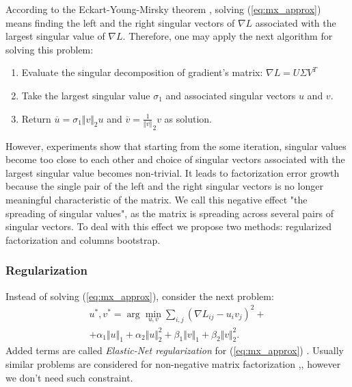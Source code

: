 \documentclass{article}
\begin{document}
According to the Eckart-Young-Mirsky theorem \cite{Eckart1936}, solving (\ref{eq:mx_approx}) means finding the left and the right singular vectors of $\nabla L$ associated with the largest singular value of $\nabla L$. Therefore, one may apply the next algorithm for solving this problem: 
\begin{enumerate}
	\item Evaluate the singular decomposition of gradient's matrix: $\nabla L = U \Sigma V^T$
	\item Take the largest singular value $\sigma_{1}$ and associated singular vectors $u$ and $v$.
	\item Return $\overline{u}={\sigma_{1}}{\Vert v \Vert}_{2}u$ and $\overline{v}=\frac{1}{\Vert v \Vert}_{2}v$ as solution.
\end{enumerate}
However, experiments show that starting from the some iteration, singular values become too close to each other and choice of singular vectors associated with the largest singular value becomes non-trivial. It leads to factorization error growth because the single pair of the left and the right singular vectors is no longer meaningful characteristic of the matrix. We call this negative effect "the spreading of singular values", as the matrix is spreading across several pairs of singular vectors.
To deal with this effect we propose two methods: regularized factorization and columns bootstrap.

\subsubsection{Regularization}
Instead of solving (\ref{eq:mx_approx}), consider the next problem:
\begin{multline}
	u^{*}, v^{*} = \arg\min_{u,v}\sum_{i,j}\left(\nabla L_{ij}-u_{i}v_{j}\right)^{2} + \\
	+\alpha_{1} \Vert u\Vert_{1} + \alpha_{2} \Vert u\Vert_{2}^{2} 
	+\beta_{1}  \Vert v\Vert_{1} + \beta_{2}  \Vert v\Vert_{2}^{2}. \label{eq:def-argmin-elasticnet}
\end{multline}
Added terms are called \emph{Elastic-Net regularization} for (\ref{eq:mx_approx}) \cite{elasticnet05}. Usually similar problems are considered for non-negative matrix factorization \cite{MahNMF},\cite{another-nmf-with-en}, however we don't need such constraint.
\end{document}
